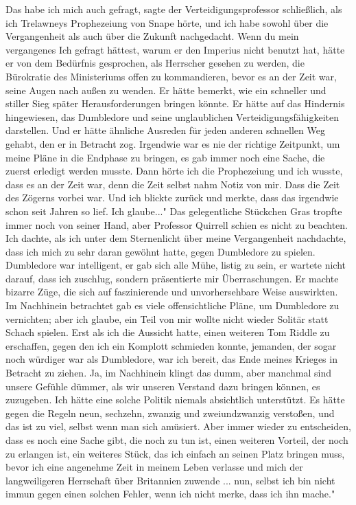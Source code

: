 \glqq{}Das habe ich mich auch gefragt\grqq{}, sagte der Verteidigungsprofessor
schließlich, \glqq{}als ich Trelawneys Prophezeiung von Snape hörte, und ich habe
sowohl über die Vergangenheit als auch über die Zukunft nachgedacht. Wenn du
mein vergangenes Ich gefragt hättest, warum er den Imperius nicht benutzt hat,
hätte er von dem Bedürfnis gesprochen, als Herrscher gesehen zu werden, die
Bürokratie des Ministeriums offen zu kommandieren, bevor es an der Zeit war,
seine Augen nach außen zu wenden. Er hätte bemerkt, wie ein schneller und
stiller Sieg später Herausforderungen bringen könnte. Er hätte auf das Hindernis
hingewiesen, das Dumbledore und seine unglaublichen Verteidigungsfähigkeiten
darstellen. Und er hätte ähnliche Ausreden für jeden anderen schnellen Weg
gehabt, den er in Betracht zog. Irgendwie war es nie der richtige Zeitpunkt, um
meine Pläne in die Endphase zu bringen, es gab immer noch eine Sache, die zuerst
erledigt werden musste. Dann hörte ich die Prophezeiung und ich wusste, dass es
an der Zeit war, denn die Zeit selbst nahm Notiz von mir. Dass die Zeit des
Zögerns vorbei war. Und ich blickte zurück und merkte, dass das irgendwie schon
seit Jahren so lief. Ich glaube..." Das gelegentliche Stückchen Gras tropfte
immer noch von seiner Hand, aber Professor Quirrell schien es nicht zu beachten.
\glqq{}Ich dachte, als ich unter dem Sternenlicht über meine Vergangenheit
nachdachte, dass ich mich zu sehr daran gewöhnt hatte, gegen Dumbledore zu
spielen. Dumbledore war intelligent, er gab sich alle Mühe, listig zu sein, er
wartete nicht darauf, dass ich zuschlug, sondern präsentierte mir
Überraschungen. Er machte bizarre Züge, die sich auf faszinierende und
unvorhersehbare Weise auswirkten. Im Nachhinein betrachtet gab es viele
offensichtliche Pläne, um Dumbledore zu vernichten; aber ich glaube, ein Teil
von mir wollte nicht wieder Solitär statt Schach spielen. Erst als ich die
Aussicht hatte, einen weiteren Tom Riddle zu erschaffen, gegen den ich ein
Komplott schmieden konnte, jemanden, der sogar noch würdiger war als Dumbledore,
war ich bereit, das Ende meines Krieges in Betracht zu ziehen. Ja, im Nachhinein
klingt das dumm, aber manchmal sind unsere Gefühle dümmer, als wir unseren
Verstand dazu bringen können, es zuzugeben. Ich hätte eine solche Politik
niemals absichtlich unterstützt. Es hätte gegen die Regeln neun, sechzehn,
zwanzig und zweiundzwanzig verstoßen, und das ist zu viel, selbst wenn man sich
amüsiert. Aber immer wieder zu entscheiden, dass es noch eine Sache gibt, die
noch zu tun ist, einen weiteren Vorteil, der noch zu erlangen ist, ein weiteres
Stück, das ich einfach an seinen Platz bringen muss, bevor ich eine angenehme
Zeit in meinem Leben verlasse und mich der langweiligeren Herrschaft über
Britannien zuwende ... nun, selbst ich bin nicht immun gegen einen solchen
Fehler, wenn ich nicht merke, dass ich ihn mache."

